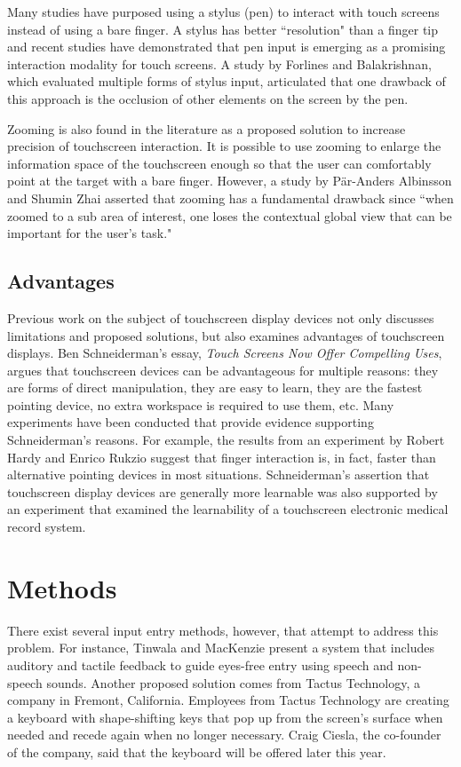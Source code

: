 \documentclass{article}
\begin{document}
Many studies have purposed using a stylus (pen) to interact with touch screens instead of using a bare finger. A stylus has better ``resolution" than a finger tip and recent studies have demonstrated that pen input is emerging as a promising interaction modality for touch screens.\cite{Bi} A study by Forlines and Balakrishnan, which evaluated multiple forms of stylus input, articulated that one drawback of this approach is the occlusion of other elements on the screen by the pen.\cite{Forlines}

Zooming is also found in the literature as a proposed solution to increase precision of touchscreen interaction. It is possible to use zooming to enlarge the information space of the touchscreen enough so that the user can comfortably point at the target with a bare finger. However, a study by P\"{a}r-Anders Albinsson and Shumin Zhai asserted that zooming has a fundamental drawback since ``when zoomed to a sub area of interest, one loses the contextual global view that can be important for the user's task."\cite{Albinsson} 

\subsection{Advantages}
Previous work on the subject of touchscreen display devices not only discusses limitations and proposed solutions, but also examines advantages of touchscreen displays. Ben Schneiderman's essay, \textit{Touch Screens Now Offer Compelling Uses},  argues that touchscreen devices can be advantageous for multiple reasons: they are forms of direct manipulation, they are easy to learn, they are the fastest pointing device, no extra workspace is required to use them, etc. \cite{73754} Many experiments have been conducted that provide evidence supporting Schneiderman's reasons. For example, the results from an experiment by Robert Hardy and Enrico Rukzio suggest that finger interaction is, in fact, faster than alternative pointing devices in most situations.\cite{Hardy:2008:TIT:1409240.1409267} Schneiderman's assertion that touchscreen display devices are generally more learnable was also supported by an experiment that examined the learnability of a touchscreen electronic medical record system.\cite{Douglas:2011:SUL:2029976.2029990}


\section{Methods}
There exist several input entry methods, however, that attempt to address this problem. For instance, Tinwala and MacKenzie present a system that includes auditory and tactile feedback to guide eyes-free entry using speech and non-speech sounds. \cite{Tinwala:2010:ETE:1868914.1868972} 
Another proposed solution comes from Tactus Technology, a company in Fremont, California. Employees from Tactus Technology are creating a keyboard with shape-shifting keys that pop up from the screen's surface when needed and recede again when no longer necessary.\cite{Tactus} Craig Ciesla, the co-founder of the company, said that the keyboard will be offered later this year. 
\end{document}

